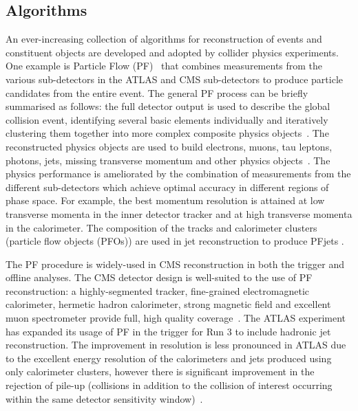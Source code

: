 \subsection{Algorithms} \label{sec:Algorithms}

An ever-increasing collection of algorithms for reconstruction of events and constituent objects are developed and adopted by collider physics experiments. One example is Particle Flow (PF)~\cite{sirunyan2017pflowcms} that combines measurements from the various sub-detectors in the ATLAS and CMS sub-detectors to produce particle candidates from the entire event. The general PF process can be briefly summarised as follows: the full detector output is used to describe the global collision event, identifying several basic elements individually and iteratively clustering them together into more complex composite physics objects~\cite{CMS:2020uim,CMS:2018rym,CMS:2014pgm}. The reconstructed physics objects are used to build electrons, muons, tau leptons, photons, jets, missing transverse momentum and other physics objects~\cite{CMS:2018jrd,CMS:2016lmd,CMS:2019ctu}. The physics performance is ameliorated by the combination of measurements from the different sub-detectors which achieve optimal accuracy in different regions of phase space. For example, the best momentum resolution is attained at low transverse momenta in the inner detector tracker and at high transverse momenta in the calorimeter. The composition of the tracks and calorimeter clusters (particle flow objects (PFOs)) are used in jet reconstruction to produce PFjets .

The PF procedure is widely-used in CMS reconstruction in both the trigger and offline analyses. The CMS detector design is well-suited to the use of PF reconstruction: a highly-segmented tracker, fine-grained electromagnetic calorimeter, hermetic hadron calorimeter, strong magnetic field and excellent muon spectrometer provide full, high quality coverage~\cite{sirunyan2017pflowcms}. The ATLAS experiment has expanded its usage of PF in the trigger for Run 3 to include hadronic jet reconstruction. The improvement in resolution is less pronounced in ATLAS due to the excellent energy resolution of the calorimeters and jets produced using only calorimeter clusters, however there is significant improvement in the rejection of pile-up (collisions in addition to the collision of interest occurring within the same detector sensitivity window)~\cite{ATLASTriggerRun3,ATLASJetPFlow}. 

